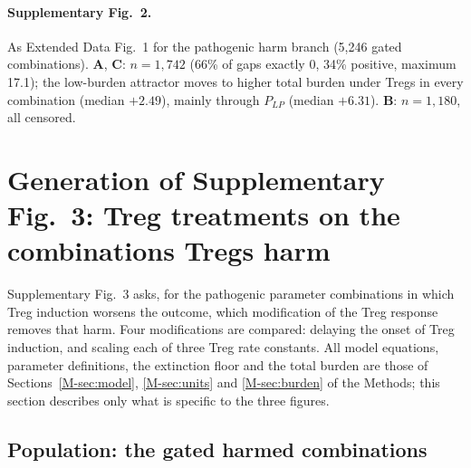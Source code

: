 \documentclass[11pt]{article}
\begin{document}
\paragraph{Supplementary Fig.~2.}
As Extended Data Fig.~1 for the pathogenic harm branch (5,246 gated combinations).
\textbf{A}, \textbf{C}:
$n = 1{,}742$ (66\% of gaps exactly 0, 34\% positive, maximum 17.1); the low-burden
attractor moves to higher total burden under Tregs in every combination (median $+2.49$),
mainly through $P_{LP}$ (median $+6.31$). \textbf{B}: $n = 1{,}180$, all censored.

\section{Generation of Supplementary Fig.~3: Treg treatments on the combinations Tregs harm}
\label{sec:figS07}


Supplementary Fig.~3 asks, for the pathogenic parameter combinations in
which Treg induction worsens the outcome, which modification of the Treg
response removes that harm. Four modifications are compared: delaying the onset
of Treg induction, and scaling each of three Treg rate constants. All model
equations, parameter definitions, the extinction floor and the total burden
are those of Sections~\ref{M-sec:model}, \ref{M-sec:units} and \ref{M-sec:burden} of the Methods; this section describes only what is
specific to the three figures.

\subsection{Population: the gated harmed combinations}
\end{document}
